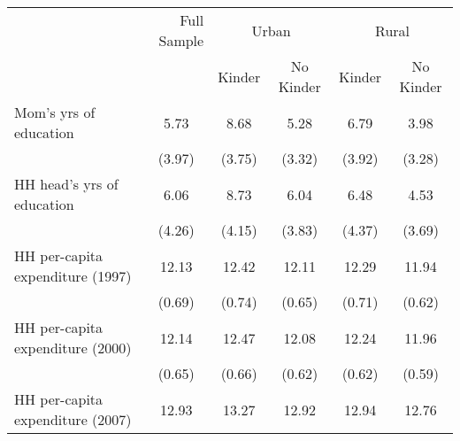 \begin{tabular}{llllll}
\cline{1-6}
\multicolumn{1}{c}{} &
  \multicolumn{1}{r}{Full Sample} &
  \multicolumn{2}{c}{Urban} &
  \multicolumn{2}{c}{Rural} \\ \cmidrule(lr){2-2} \cmidrule(lr){3-4} \cmidrule(lr){5-6}
\multicolumn{1}{c}{} &
  \multicolumn{1}{r}{} &
  \multicolumn{1}{c}{Kinder} &
  \multicolumn{1}{c}{No Kinder} &
  \multicolumn{1}{c}{Kinder} &
  \multicolumn{1}{c}{No Kinder} \\
\cline{1-6}
\multicolumn{1}{l}{Mom's yrs of education} &
  \multicolumn{1}{c}{5.73} &
  \multicolumn{1}{c}{8.68} &
  \multicolumn{1}{c}{5.28} &
  \multicolumn{1}{c}{6.79} &
  \multicolumn{1}{c}{3.98} \\
\multicolumn{1}{l}{} &
  \multicolumn{1}{c}{(3.97)} &
  \multicolumn{1}{c}{(3.75)} &
  \multicolumn{1}{c}{(3.32)} &
  \multicolumn{1}{c}{(3.92)} &
  \multicolumn{1}{c}{(3.28)} \\
\multicolumn{1}{l}{HH head's yrs of education} &
  \multicolumn{1}{c}{6.06} &
  \multicolumn{1}{c}{8.73} &
  \multicolumn{1}{c}{6.04} &
  \multicolumn{1}{c}{6.48} &
  \multicolumn{1}{c}{4.53} \\
\multicolumn{1}{l}{} &
  \multicolumn{1}{c}{(4.26)} &
  \multicolumn{1}{c}{(4.15)} &
  \multicolumn{1}{c}{(3.83)} &
  \multicolumn{1}{c}{(4.37)} &
  \multicolumn{1}{c}{(3.69)} \\
\multicolumn{1}{l}{HH per-capita expenditure (1997)} &
  \multicolumn{1}{c}{12.13} &
  \multicolumn{1}{c}{12.42} &
  \multicolumn{1}{c}{12.11} &
  \multicolumn{1}{c}{12.29} &
  \multicolumn{1}{c}{11.94} \\
\multicolumn{1}{l}{} &
  \multicolumn{1}{c}{(0.69)} &
  \multicolumn{1}{c}{(0.74)} &
  \multicolumn{1}{c}{(0.65)} &
  \multicolumn{1}{c}{(0.71)} &
  \multicolumn{1}{c}{(0.62)} \\
\multicolumn{1}{l}{HH per-capita expenditure (2000)} &
  \multicolumn{1}{c}{12.14} &
  \multicolumn{1}{c}{12.47} &
  \multicolumn{1}{c}{12.08} &
  \multicolumn{1}{c}{12.24} &
  \multicolumn{1}{c}{11.96} \\
\multicolumn{1}{l}{} &
  \multicolumn{1}{c}{(0.65)} &
  \multicolumn{1}{c}{(0.66)} &
  \multicolumn{1}{c}{(0.62)} &
  \multicolumn{1}{c}{(0.62)} &
  \multicolumn{1}{c}{(0.59)} \\
\multicolumn{1}{l}{HH per-capita expenditure (2007)} &
  \multicolumn{1}{c}{12.93} &
  \multicolumn{1}{c}{13.27} &
  \multicolumn{1}{c}{12.92} &
  \multicolumn{1}{c}{12.94} &
  \multicolumn{1}{c}{12.76} \\

\end{tabular}
